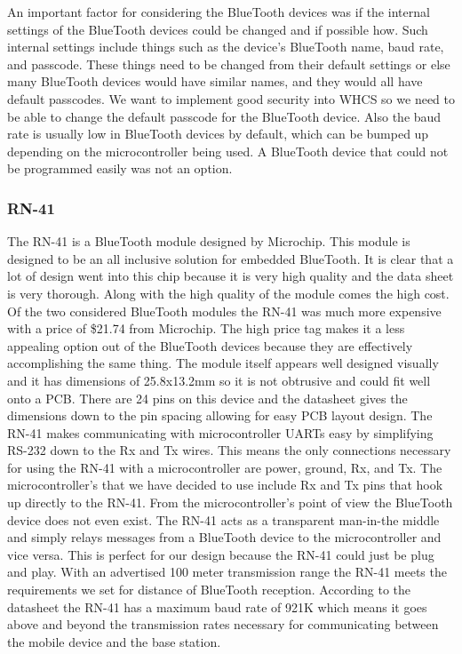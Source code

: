 An important factor for considering the BlueTooth devices was if the internal
settings of the BlueTooth devices could be changed and if possible how. Such
internal settings include things such as the device{}'s BlueTooth name, baud
rate, and passcode. These things need to be changed from their default settings
or else many BlueTooth devices would have similar names, and they would all
have default passcodes. We want to implement good security into WHCS so we need
to be able to change the default passcode for the BlueTooth device. Also the
baud rate is usually low in BlueTooth devices by default, which can be bumped
up depending on the microcontroller being used. A BlueTooth device that could
not be programmed easily was not an option.

\subsubsection{RN-41}
The RN{}-41 is a BlueTooth module designed by Microchip. This module is
designed to be an all inclusive solution for embedded BlueTooth. It is clear
that a lot of design went into this chip because it is very high quality and
the data sheet is very thorough. Along with the high quality of the module
comes the high cost. Of the two considered BlueTooth modules the RN{}-41 was
much more expensive with a price of \$21.74 from Microchip. The high price tag
makes it a less appealing option out of the BlueTooth devices because they are
effectively accomplishing the same thing. The module itself appears well
designed visually and it has dimensions of 25.8x13.2mm so it is not obtrusive
and could fit well onto a PCB. There are 24 pins on this device and the
datasheet gives the dimensions down to the pin spacing allowing for easy PCB
layout design. The RN{}-41 makes communicating with microcontroller UARTs easy
by simplifying RS{}-232 down to the Rx and Tx wires. This means the only
connections necessary for using the RN{}-41 with a microcontroller are power,
ground, Rx, and Tx. The microcontroller{}'s that we have decided to use include
Rx and Tx pins that hook up directly to the RN{}-41. From the
microcontroller{}'s point of view the BlueTooth device does not even exist. The
RN{}-41 acts as a transparent man{}-in{}-the middle and simply relays messages
from a BlueTooth device to the microcontroller and vice versa. This is perfect
for our design because the RN{}-41 could just be plug and play. With an
advertised 100 meter transmission range the RN{}-41 meets the requirements we
set for distance of BlueTooth reception.  According to the datasheet the
RN{}-41 has a maximum baud rate of 921K which means it goes above and beyond
the transmission rates necessary for communicating between the mobile device
and the base station.

